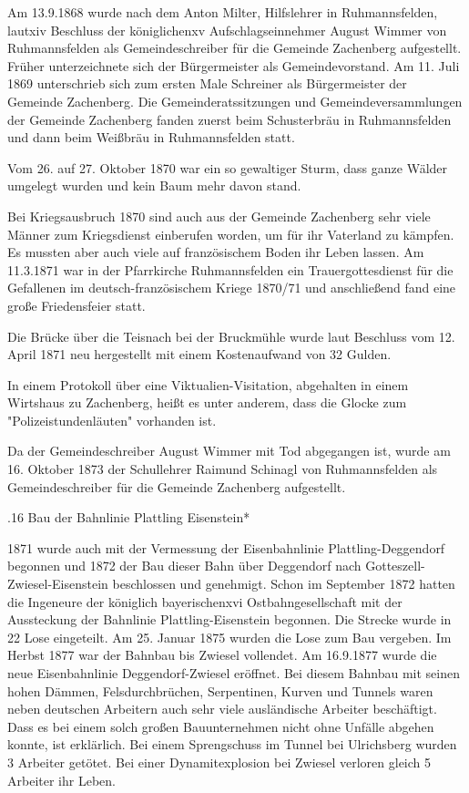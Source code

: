 Am 13.9.1868 wurde nach dem Anton Milter, Hilfslehrer in Ruhmannsfelden, lautxiv
Beschluss der königlichenxv Aufschlagseinnehmer August Wimmer von Ruhmannsfelden
als Gemeindeschreiber für die Gemeinde Zachenberg aufgestellt. Früher
unterzeichnete sich der Bürgermeister als Gemeindevorstand. Am 11. Juli 1869
unterschrieb sich zum ersten Male Schreiner als Bürgermeister der Gemeinde
Zachenberg. Die Gemeinderatssitzungen und Gemeindeversammlungen der Gemeinde
Zachenberg fanden zuerst beim Schusterbräu in Ruhmannsfelden und dann beim
Weißbräu in Ruhmannsfelden statt.

Vom 26. auf 27. Oktober 1870 war ein so gewaltiger Sturm, dass ganze Wälder
umgelegt wurden und kein Baum mehr davon stand.

Bei Kriegsausbruch 1870 sind auch aus der Gemeinde Zachenberg sehr viele Männer
zum Kriegsdienst einberufen worden, um für ihr Vaterland zu kämpfen. Es mussten
aber auch viele auf französischem Boden ihr Leben lassen. Am 11.3.1871 war in
der Pfarrkirche Ruhmannsfelden ein Trauergottesdienst für die Gefallenen im
deutsch-französischem Kriege 1870/71 und anschließend fand eine große
Friedensfeier statt.

Die Brücke über die Teisnach bei der Bruckmühle wurde laut Beschluss vom 12.
April 1871 neu hergestellt mit einem Kostenaufwand von 32 Gulden.

In einem Protokoll über eine Viktualien-Visitation, abgehalten in einem
Wirtshaus zu Zachenberg, heißt es unter anderem, dass die Glocke zum
"Polizeistundenläuten" vorhanden ist.

Da der Gemeindeschreiber August Wimmer mit Tod abgegangen ist, wurde am 16.
Oktober 1873 der Schullehrer Raimund Schinagl von Ruhmannsfelden als
Gemeindeschreiber für die Gemeinde Zachenberg aufgestellt.

.16 Bau der Bahnlinie Plattling Eisenstein*

1871 wurde auch mit der Vermessung der Eisenbahnlinie Plattling-Deggendorf
begonnen und 1872 der Bau dieser Bahn über Deggendorf nach
Gotteszell-Zwiesel-Eisenstein beschlossen und genehmigt. Schon im September 1872
hatten die Ingeneure der königlich bayerischenxvi Ostbahngesellschaft mit der
Aussteckung der Bahnlinie Plattling-Eisenstein begonnen. Die Strecke wurde in 22
Lose eingeteilt. Am 25. Januar 1875 wurden die Lose zum Bau vergeben. Im Herbst
1877 war der Bahnbau bis Zwiesel vollendet. Am 16.9.1877 wurde die neue
Eisenbahnlinie Deggendorf-Zwiesel eröffnet. Bei diesem Bahnbau mit seinen hohen
Dämmen, Felsdurchbrüchen, Serpentinen, Kurven und Tunnels waren neben deutschen
Arbeitern auch sehr viele ausländische Arbeiter beschäftigt. Dass es bei einem
solch großen Bauunternehmen nicht ohne Unfälle abgehen konnte, ist erklärlich.
Bei einem Sprengschuss im Tunnel bei Ulrichsberg wurden 3 Arbeiter getötet. Bei
einer Dynamitexplosion bei Zwiesel verloren gleich 5 Arbeiter ihr Leben.



